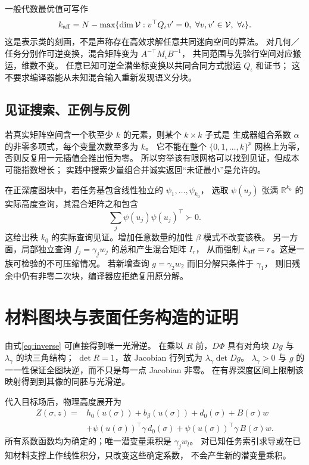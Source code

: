 \documentclass[11pt,a4paper]{article}
\numberwithin{equation}{section}
\theoremstyle{definition}
\newcommand{\R}{\mathbb R}
\begin{document}
一般代数最优值可写作
\[
 k_{\rm aff}=N-\max\{\dim\mathcal V:
       v^\top Q_\iota v'=0,\ \forall v,v'\in\mathcal V,\ \forall\iota\}.
\]
这是表示类的刻画，不是声称存在高效求解任意共同迷向空间的算法。
对几何／任务分别作可逆变换，混合矩阵变为 \(A^{-\top}M_\iota B^{-1}\)，
共同范围与先验行空间对应搬运，维数不变。
任意已知可逆全潜坐标变换以共同合同方式搬运 \(Q_\iota\) 和证书；
这不要求编译器能从未知混合输入重新发现语义分块。

\subsection{见证搜索、正例与反例}
若真实矩阵空间含一个秩至少 \(k\) 的元素，则某个 \(k\times k\) 子式是
生成器组合系数 \(\alpha\) 的非零多项式，每个变量次数至多为 \(k\)。
它不能在整个 \(\{0,1,\ldots,k\}^p\) 网格上为零，否则反复用一元插值会推出恒为零。
所以穷举该有限网格可以找到见证，但成本可能指数增长；
实践中搜索少量组合并诚实返回“未证最小”是允许的。

在正深度图块中，若任务基包含线性独立的 \(\psi_1,\ldots,\psi_{k_0}\)，
选取 \(\psi(u_j)\) 张满 \(\R^{k_0}\) 的实际高度查询，其混合矩阵之和包含
\[
 \sum_j\psi(u_j)\psi(u_j)^\top\succ0 .
\]
这给出秩 \(k_0\) 的实际查询见证。增加任意数量的加性 \(\beta\) 模式不改变该秩。
另一方面，局部独立查询 \(f_j=\gamma_jw_j\) 的总和产生混合矩阵 \(I_r\)，
从而强制 \(k_{\rm aff}=r\)。这是一族可检验的不可压缩情况。
若新增查询 \(g=\gamma_2w_2\) 而旧分解只条件于 \(\gamma_1\)，
则旧残余中仍有非零二次块，编译器应拒绝复用原分解。

\section{材料图块与表面任务构造的证明}
\label{app:geometry}
由式\eqref{eq:inverse} 可直接得到唯一光滑逆。
在乘以 \(R\) 前，\(D\Phi\) 具有对角块 \(Dg\) 与 \(\lambda_\gamma\) 的块三角结构；
\(\det R=1\)，故 Jacobian 行列式为 \(\lambda_\gamma\det Dg\)。
\(\lambda_\gamma>0\) 与 \(g\) 的一一性保证全图块逆，而不只是每一点 Jacobian 非零。
在有界深度区间上限制该映射得到到其像的同胚与光滑逆。

代入目标场后，物理高度展开为
\begin{align*}
 Z(\sigma,z)={}&h_0(u(\sigma))+b_\beta(u(\sigma))+d_0(\sigma)+B(\sigma)w\\
 &+\psi(u(\sigma))^\top\gamma\,d_0(\sigma)
 +\psi(u(\sigma))^\top\gamma\,B(\sigma)w .
\end{align*}
所有系数函数均为确定的；唯一潜变量乘积是 \(\gamma_jw_l\)。
对已知任务索引求导或在已知材料支撑上作线性积分，只改变这些确定系数，
不会产生新的潜变量乘积。
\end{document}

